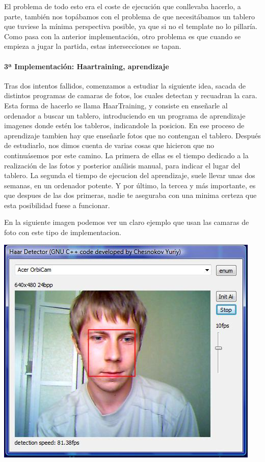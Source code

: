 \documentclass[12pt,a4paper]{report}
\begin{document}
El problema de todo esto era el coste de ejecución que conllevaba hacerlo, a
parte, también nos topábamos con el problema de que necesitábamos un tablero que
tuviese la mínima perspectiva posible, ya que si no el template no lo pillaría. 
Como pasa con la anterior implementación, otro problema es que cuando se empieza
a jugar la partida, estas intersecciones se tapan. 


\paragraph{3ª Implementación: Haartraining, aprendizaje}

Tras dos intentos fallidos, comenzamos a estudiar la siguiente idea, sacada de
distintos programas de camaras de fotos, los cuales detectan y recuadran la
cara. Esta forma de hacerlo se llama HaarTraining, y consiste en enseñarle al
ordenador a buscar un tablero, introduciendo en un programa de aprendizaje
imagenes donde estén los tableros, indicandole la posicion. En ese proceso de
aprendizaje tambien hay que enseñarle fotos que no contengan el tablero.
Después de estudiarlo, nos dimos cuenta de varias cosas que hicieron que no
continuásemos por este camino. La primera de ellas es el tiempo dedicado a la
realización de las fotos y posterior análisis manual, para indicar el lugar del
tablero. La segunda el tiempo de ejecucion del aprendizaje, suele llevar unas
dos semanas, en un ordenador potente. Y por último, la tercea y más importante,
es que despues de las dos primeras, nadie te aseguraba con una minima certeza 
que esta posibilidad fuese a funcionar.

En la siguiente imagen podemos ver un claro ejemplo que usan las camaras de foto
con este tipo de implementacion.

\includegraphics[scale=1]{haartraining.jpg} 
\end{document}
